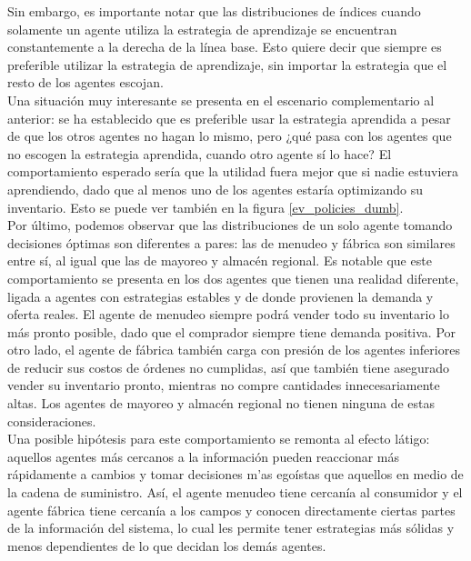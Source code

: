 Sin embargo, es importante notar que las distribuciones de \'indices cuando solamente un agente utiliza la estrategia de aprendizaje se encuentran constantemente a la derecha de la l\'inea base. Esto quiere decir que siempre es preferible utilizar la estrategia de aprendizaje, sin importar la estrategia que el resto de los agentes escojan.\\

Una situaci\'on muy interesante se presenta en el escenario complementario al anterior: se ha establecido que es preferible usar la estrategia aprendida a pesar de que los otros agentes no hagan lo mismo, pero ¿qu\'e pasa con los agentes que no escogen la estrategia aprendida, cuando otro agente s\'i lo hace? El comportamiento esperado ser\'ia que la utilidad fuera mejor que si nadie estuviera aprendiendo, dado que al menos uno de los agentes estar\'ia optimizando su inventario. Esto se puede ver tambi\'en en la figura \ref{ev_policies_dumb}.\\

Por \'ultimo, podemos observar que las distribuciones de un solo agente tomando decisiones \'optimas son diferentes a pares: las de menudeo y f\'abrica son similares entre s\'i, al igual que las de mayoreo y almac\'en regional. Es notable que este comportamiento se presenta en los dos agentes que tienen una realidad diferente, ligada a agentes con estrategias estables y de donde provienen la demanda y oferta reales. El agente de menudeo siempre podr\'a vender todo su inventario lo m\'as pronto posible, dado que el comprador siempre tiene demanda positiva. Por otro lado, el agente de f\'abrica tambi\'en carga con presi\'on de los agentes inferiores de reducir sus costos de \'ordenes no cumplidas, as\'i que tambi\'en tiene asegurado vender su inventario pronto, mientras no compre cantidades innecesariamente altas. Los agentes de mayoreo y almac\'en regional no tienen ninguna de estas consideraciones.\\

Una posible hip\'otesis para este comportamiento se remonta al efecto l\'atigo: aquellos agentes m\'as cercanos a la informaci\'on pueden reaccionar m\'as r\'apidamente a cambios y tomar decisiones m'as ego\'istas que aquellos en medio de la cadena de suministro. As\'i, el agente menudeo tiene cercan\'ia al consumidor y el agente f\'abrica tiene cercan\'ia a los campos y conocen directamente ciertas partes de la informaci\'on del sistema, lo cual les permite tener estrategias m\'as s\'olidas y menos dependientes de lo que decidan los dem\'as agentes.\\

